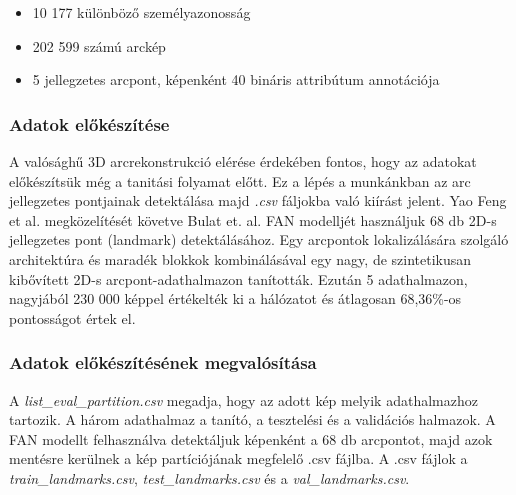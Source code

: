 \documentclass[12pt,a4]{article}
\begin{document}
    \begin{itemize}
        \item 10 177 különböző személyazonosság
        \item 202 599 számú arckép
        \item 5 jellegzetes arcpont, képenként 40 bináris attribútum annotációja
    \end{itemize}

    
	\subsubsection{Adatok előkészítése}

   A valósághű 3D arcrekonstrukció elérése érdekében fontos, hogy az adatokat előkészítsük még a tanitási folyamat előtt. Ez a lépés a munkánkban az arc jellegzetes pontjainak detektálása majd \textit{.csv} fáljokba való kiírást jelent. Yao Feng et al. \cite{deca} megközelítését követve Bulat et. al. \cite{bulat} FAN modelljét használjuk 68 db 2D-s jellegzetes pont (landmark) detektálásához. Egy arcpontok lokalizálására szolgáló architektúra és maradék blokkok kombinálásával egy nagy, de szintetikusan kibővített 2D-s arcpont-adathalmazon tanították. Ezután 5 adathalmazon, nagyjából 230 000 képpel értékelték ki a hálózatot és átlagosan 68,36\%-os pontosságot értek el.

   \subsubsection{Adatok előkészítésének megvalósítása}

   A \textit{list\_eval\_partition.csv} megadja, hogy az adott kép melyik adathalmazhoz tartozik.
   A három adathalmaz a tanító, a tesztelési és a validációs halmazok. A FAN modellt felhasználva detektáljuk képenként a 68 db arcpontot, majd azok mentésre kerülnek a kép partíciójának megfelelő .csv fájlba. A .csv fájlok a \textit{train\_landmarks.csv}, \textit{test\_landmarks.csv} és a \textit{val\_landmarks.csv}.
				
   
\end{document}
